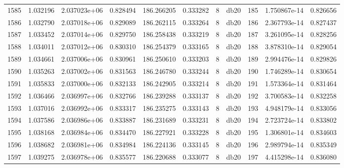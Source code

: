 \begin{tabular}{lrrrrrrlrrr}
1585 &    1.032196 &        2.037023e+06 &  0.828494 &              186.266205 &    0.333282 &       8 &         db20 &    185 &   1.750867e-14 &      0.826656 \\
1586 &    1.032790 &        2.037018e+06 &  0.829089 &              186.262115 &    0.333264 &       8 &         db20 &    186 &   2.367793e-14 &      0.827437 \\
1587 &    1.033452 &        2.037014e+06 &  0.829750 &              186.258438 &    0.333219 &       8 &         db20 &    187 &   3.261095e-14 &      0.828256 \\
1588 &    1.034011 &        2.037012e+06 &  0.830310 &              186.254379 &    0.333165 &       8 &         db20 &    188 &   3.878310e-14 &      0.829054 \\
1589 &    1.034661 &        2.037006e+06 &  0.830961 &              186.250610 &    0.333203 &       8 &         db20 &    189 &   2.994476e-14 &      0.829826 \\
1590 &    1.035263 &        2.037002e+06 &  0.831563 &              186.246780 &    0.333244 &       8 &         db20 &    190 &   1.746289e-14 &      0.830654 \\
1591 &    1.035833 &        2.037000e+06 &  0.832133 &              186.242905 &    0.333214 &       8 &         db20 &    191 &   1.573364e-14 &      0.831464 \\
1592 &    1.036466 &        2.036997e+06 &  0.832766 &              186.239288 &    0.333137 &       8 &         db20 &    192 &   3.700583e-14 &      0.832258 \\
1593 &    1.037016 &        2.036992e+06 &  0.833317 &              186.235275 &    0.333143 &       8 &         db20 &    193 &   4.948179e-14 &      0.833056 \\
1594 &    1.037586 &        2.036986e+06 &  0.833887 &              186.231689 &    0.333231 &       8 &         db20 &    194 &   2.723724e-14 &      0.833802 \\
1595 &    1.038168 &        2.036984e+06 &  0.834470 &              186.227921 &    0.333228 &       8 &         db20 &    195 &   1.306801e-14 &      0.834603 \\
1596 &    1.038682 &        2.036981e+06 &  0.834984 &              186.224136 &    0.333145 &       8 &         db20 &    196 &   2.989794e-14 &      0.835349 \\
1597 &    1.039275 &        2.036978e+06 &  0.835577 &              186.220688 &    0.333077 &       8 &         db20 &    197 &   4.415298e-14 &      0.836080 \\

\end{tabular}
